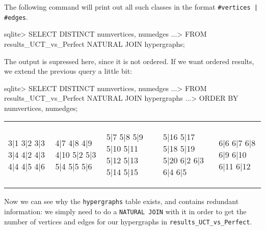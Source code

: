 The following command will print out all such classes in the format \texttt{\#vertices | \#edges}.
\begin{code}
sqlite> SELECT DISTINCT numvertices, numedges
   ...> FROM results_UCT_vs_Perfect NATURAL JOIN hypergraphs;
\end{code}
The output is supressed here, since it is not ordered.
If we want ordered results, we extend the previous query a little bit:
\begin{code}
sqlite> SELECT DISTINCT numvertices, numedges
   ...> FROM results_UCT_vs_Perfect NATURAL JOIN hypergraphs
   ...> ORDER BY numvertices, numedges;

\end{code}

\begin{tabular}{| p{0.5in} | p{0.5in} | p{0.5in} | p{0.5in} | p{0.5in} |}
\begin{minipage}{0.5in}
\begin{datalisting}
3|1
3|2
3|3
3|4
4|2
4|3
4|4
4|5
4|6
\end{datalisting}
\end{minipage}
&
\begin{minipage}{0.5in}
\begin{datalisting}
4|7
4|8
4|9
4|10
5|2
5|3
5|4
5|5
5|6
\end{datalisting}
\end{minipage}
&
\begin{minipage}{0.5in}
\begin{datalisting}
5|7
5|8
5|9
5|10
5|11
5|12
5|13
5|14
5|15
\end{datalisting}
\end{minipage}
&
\begin{minipage}{0.5in}
\begin{datalisting}
5|16
5|17
5|18
5|19
5|20
6|2
6|3
6|4
6|5
\end{datalisting}
\end{minipage}
&
\begin{minipage}{0.5in}
\begin{datalisting}
6|6
6|7
6|8
6|9
6|10
6|11
6|12
\end{datalisting}
\end{minipage}
\\
\end{tabular}

Now we can see why the \texttt{hypergraphs} table exists, and contains redundant information: we simply need to do a \texttt{NATURAL JOIN} with it in order to get the number of vertices and edges for our hypergraphs in \texttt{results\_UCT\_vs\_Perfect}.

